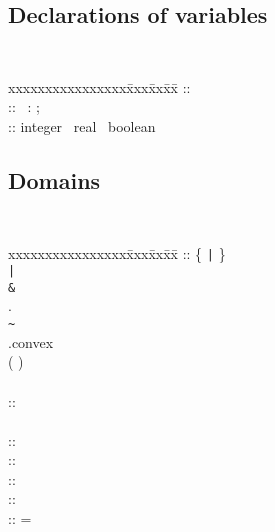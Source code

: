 \subsection{Declarations of variables}
{\tt
\begin{tabbing}
xxxxxxxxxxxxxxxx\= xxx\= xx\=  xx\= \kill
\VarDeclList \>::\>\> \VarDeclList *\\
\VarDeclaration \>::\>\> \IdentifierList\ :  \ScalarType ;\\
\ScalarType \> ::\>\> integer \Alt\ real \Alt\ boolean
\end{tabbing}
}

\subsection{Domains}
{\tt
\begin{tabbing}
xxxxxxxxxxxxxxxx\= xxx\= xx\=  xx\= \kill
\Domain \>::\>\> \{ \IndexList \verb~|~ \ConstraintList \}\\
\>\>\Alt\> \Domain \verb~|~ \Domain\\
\>\>\Alt\> \Domain \verb~&~ \Domain\\
\>\>\Alt\> \Domain .\AffineFunction\\
\>\>\Alt\> \verb'~' \Domain\\
\>\>\Alt\> \Domain .convex\\
\>\>\Alt\> ( \Domain )\\
\\
\IndexList\>::\>\> \Opt{\IndexList ,} \Identifier\\
\\
\ConstraintList\>::\>\> \Opt{\ConstraintList ;} \Constraint\\
\Constraint \>::\>\> \IncreasingSeq \Alt\ \DecreasingSeq \Alt\ \EqualitySeq\\
\IncreasingSeq \>::\>\> \Group{ \IncreasingSeq \Alt\ \IndexExpList }
  \Group{ < \Alt\ <= } \IndexExpList\\
\DecreasingSeq \>::\>\> \Group{ \DecreasingSeq \Alt\ \IndexExpList }
  \Group{ > \Alt\ >= } \IndexExpList\\
\EqualitySeq\>::\>\> \Group{ \EqualitySeq \Alt\ \IndexExpList } = \IndexExpList
\end{tabbing}
}

